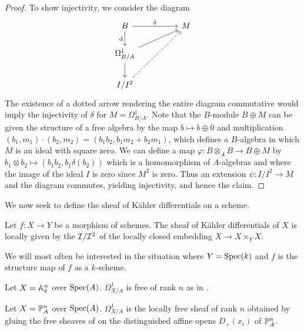 \begin{proof}
    To show injectivity, we consider the diagram 
    $$%
    \begin{tikzcd}
        B && M \\
        {\Omega^{1}_{B/A}} \\
        {I/I^{2}}
        \arrow["\delta", from=1-1, to=1-3]
        \arrow["\dform"', from=1-1, to=2-1]
        \arrow[from=2-1, to=1-3]
        \arrow[from=2-1, to=3-1]
        \arrow[dashed, from=3-1, to=1-3]
    \end{tikzcd}$$
    The existence of a dotted arrow rendering the entire diagram commutative would imply the injectivity of $\delta$ for $M=\Omega^{1}_{B/A}$. Note that the $B$-module $B\oplus M$ can be given the structure of a free algebra by the map $b\mapsto b\oplus0$ and multiplication $(b_{1},m_{1})\cdot(b_{2},m_{2})=(b_{1}b_{2},b_{1}m_{2}+b_{2}m_{1})$, which defines a $B$-algebra in which $M$ is an ideal with square zero. We can define a map $\varphi:B\otimes_{A}B\to B\oplus M$ by $b_{1}\otimes b_{2}\mapsto (b_{1}b_{2},b_{1}\delta(b_{2}))$ which is a homomorphism of $A$-algebras and where the image of the ideal $I$ is zero since $M^{2}$ is zero. Thus an extension $\psi:I/I^{2}\to M$ and the diagram commutes, yielding injectivity, and hence the claim. 
\end{proof}
We now seek to define the sheaf of K\"{a}hler differentials on a scheme. 
\begin{definition}\label{def: kahler differentials of a scheme}
    Let $f:X\to Y$ be a morphism of schemes. The sheaf of K\"{a}hler differentials of $X$ is locally given by the $\mathcal{I}/\mathcal{I}^{2}$ of the locally closed embedding $X\to X\times_{Y}X$. 
\end{definition}
We will most often be interested in the situation where $Y=\operatorname{Spec}(k)$ and $f$ is the structure map of $f$ as a $k$-scheme. 
\begin{example}\label{ex: affine space scheme differentials}
    Let $X=\mathbb{A}^{n}_{k}$ over $\operatorname{Spec}(A)$. $\Omega^{1}_{X/A}$ is free of rank $n$ as in . 
\end{example}
\begin{example}\label{ex: projective space scheme differentials}
    Let $X=\mathbb{P}^{n}_{A}$ over $\operatorname{Spec}(A)$. $\Omega^{1}_{X/A}$ is the locally free sheaf of rank $n$ obtained by gluing the free sheaves of  on the distinguished affine opens $D_{+}(x_{i})$ of $\mathbb{P}^{n}_{A}$.  
\end{example}
